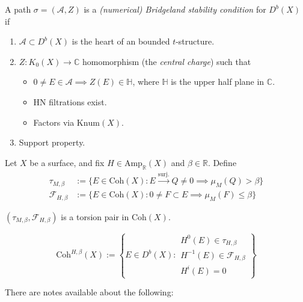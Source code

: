 \begin{definition}
\label{gscag-label-002}
A path $\sigma=(\mathcal{A},Z)$ is a {\it
(numerical) Bridgeland stability condition}
for $D^b(X)$ if
\begin{enumerate}
\item $\mathcal{A} \subset D^b(X)$ is the
heart of an bounded $t$-structure.
\item $Z:K_0(X) \to \mathbb{C}$ homomorphism
(the {\it central charge}) such
that
\begin{itemize}
\item $0 \neq E \in \mathcal{A} \implies
Z(E) \in \mathbb{H}$, where
$\mathbb{H}$ is the upper half plane in
$\mathbb{C}$.
\item HN filtrations exist.
\item Factors via $\text{Knum}(X)$.
\end{itemize}
\item Support property.
\end{enumerate}
\end{definition}

Let $X$ be a surface, and fix  $H \in
\text{Amp}_\mathbb{R}(X)$ and $\beta \in
\mathbb{R}$. Define
$$
\begin{aligned}
\tau_{M,\beta}&:=\{E \in \text{Coh}(X):E
\overset{\text{surj.}}{\to} Q \neq 0
\implies \mu_M(Q)>\beta\}\\
\mathcal{F}_{H,\beta}&:=\{E \in
\text{Coh}(X):0 \neq  F \subset E
\implies \mu_M(F) \leq \beta\}
\end{aligned}
$$

\begin{exercise}
\label{exercise-torsion-pair}
$(\tau_{M,\beta},\mathcal{F}_{H,\beta})$ is a
torsion pair in $\text{Coh}(X)$.
\end{exercise}

\begin{definition}
\label{definition-Coh-H-beta}
$$
\text{Coh}^{H,\beta}(X):=\left\{ E \in
D^b(X):
\substack{H^0(E) \in \tau_{H,\beta} \\
H^{-1}(E) \in \mathcal{F}_{H,\beta}\\
H^i(E)=0} \right\}
$$
\end{definition}

\begin{exercise}
\label{exercise-new-slope}

\end{exercise}

There are notes available about the
following:

